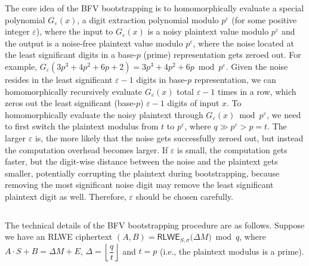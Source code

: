 The core idea of the BFV bootstrapping is to homomorphically evaluate a special polynomial $G_\varepsilon(x)$, a digit extraction polynomial modulo $p^\varepsilon$ (for some positive integer $\varepsilon$), where the input to $G_\varepsilon(x)$ is a noisy plaintext value modulo $p^\varepsilon$ and the output is a noise-free plaintext value modulo $p^\varepsilon$, where the noise located at the least significant digits in a base-$p$ (prime) representation gets zeroed out. For example, $G_\varepsilon(3p^3 + 4p^2 + 6p + 2) = 3p^3 + 4p^2 + 6p \bmod p^\varepsilon$. Given the noise resides in the least significant $\varepsilon-1$ digits in base-$p$ representation, we can homomorphically recursively evaluate $G_\varepsilon(x)$ total $\varepsilon-1$ times in a row, which zeros out the least significant (base-$p$) $\varepsilon-1$ digits of input $x$. To homomorphically evaluate the noisy plaintext through $G_\varepsilon(x) \bmod p^\varepsilon$, we need to first switch the plaintext modulus from $t$ to $p^\varepsilon$, where $q \gg p^\varepsilon > p = t$. The larger $\varepsilon$ is, the more likely that the noise gets successfully zeroed out, but instead the computation overhead becomes larger. If $\varepsilon$ is small, the computation gets faster, but the digit-wise distance between the noise and the plaintext gets smaller, potentially corrupting the plaintext during bootstrapping, because removing the most significant noise digit may remove the least significant plaintext digit as well. Therefore, $\varepsilon$ should be chosen carefully. 

$ $

The technical details of the BFV bootstrapping procedure are as follows. Suppose we have an RLWE ciphertext $(A, B)  = \textsf{RLWE}_{S, \sigma}\bm(\Delta M\bm) \bmod q$, where $A\cdot S + B = \Delta M + E$, \text{ } $\Delta = \left\lfloor\dfrac{q}{t}\right\rfloor$ and $t = p$ (i.e., the plaintext modulus is a prime).

